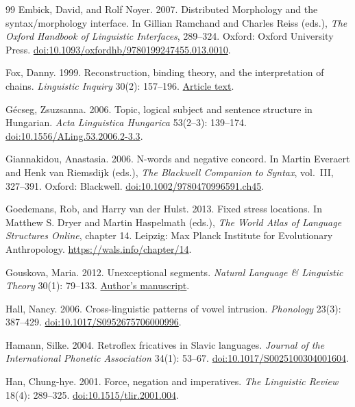\begin{thebibliography}{99}
Embick, David, and Rolf Noyer. 2007.
Distributed Morphology and the syntax/morphology interface.
In Gillian Ramchand and Charles Reiss (eds.),
\textit{The Oxford Handbook of Linguistic Interfaces}, 289--324.
Oxford: Oxford University Press.
\href{https://doi.org/10.1093/oxfordhb/9780199247455.013.0010}{doi:10.1093/oxfordhb/9780199247455.013.0010}.

Fox, Danny. 1999.
Reconstruction, binding theory, and the interpretation of chains.
\textit{Linguistic Inquiry} 30(2): 157--196.
\href{https://semantics.uchicago.edu/kennedy/classes/nu/460/S04/fox99.pdf}{Article text}.

Gécseg, Zsuzsanna. 2006.
Topic, logical subject and sentence structure in Hungarian.
\textit{Acta Linguistica Hungarica} 53(2--3): 139--174.
\href{https://doi.org/10.1556/ALing.53.2006.2-3.3}{doi:10.1556/ALing.53.2006.2-3.3}.

Giannakidou, Anastasia. 2006.
N-words and negative concord.
In Martin Everaert and Henk van Riemsdijk (eds.),
\textit{The Blackwell Companion to Syntax}, vol.~III, 327--391.
Oxford: Blackwell.
\href{https://doi.org/10.1002/9780470996591.ch45}{doi:10.1002/9780470996591.ch45}.

Goedemans, Rob, and Harry van der Hulst. 2013.
Fixed stress locations.
In Matthew S. Dryer and Martin Haspelmath (eds.),
\textit{The World Atlas of Language Structures Online}, chapter 14.
Leipzig: Max Planck Institute for Evolutionary Anthropology.
\url{https://wals.info/chapter/14}.

Gouskova, Maria. 2012.
Unexceptional segments.
\textit{Natural Language \& Linguistic Theory} 30(1): 79--133.
\href{https://www.gouskova.com/wp-content/uploads/2016/03/gouskova_2012_nllt.pdf}{Author's manuscript}.

Hall, Nancy. 2006.
Cross-linguistic patterns of vowel intrusion.
\textit{Phonology} 23(3): 387--429.
\href{https://doi.org/10.1017/S0952675706000996}{doi:10.1017/S0952675706000996}.

Hamann, Silke. 2004.
Retroflex fricatives in Slavic languages.
\textit{Journal of the International Phonetic Association} 34(1): 53--67.
\href{https://doi.org/10.1017/S0025100304001604}{doi:10.1017/S0025100304001604}.

Han, Chung-hye. 2001.
Force, negation and imperatives.
\textit{The Linguistic Review} 18(4): 289--325.
\href{https://doi.org/10.1515/tlir.2001.004}{doi:10.1515/tlir.2001.004}.


\end{thebibliography}
